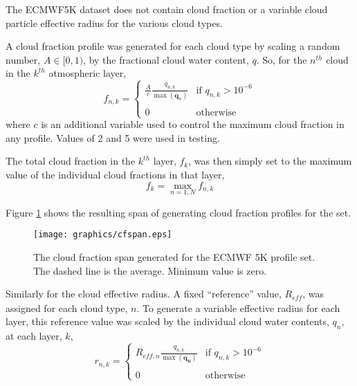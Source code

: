 The ECMWF5K dataset does not contain cloud fraction or a variable cloud particle effective radius for the various cloud types.

A cloud fraction profile was generated for each cloud type by scaling a random number, $A \in [0,1)$, by the fractional cloud water content, $q$. So, for the $n^{th}$ cloud in the $k^{th}$ atmospheric layer,
\begin{equation}
  f_{n,k} = \left\{
  \begin{array}{cl}
    \frac{\displaystyle{A}}{\displaystyle{c}}\frac{\displaystyle{q_{n,k}}}{\displaystyle{\max(\mathbf{q}_n)}} & \text{if } q_{n,k} > 10^{-6}\\\\
    0 & \text{otherwise}
  \end{array} \right.
  \label{eqn:f_individual}
\end{equation}
where $c$ is an additional variable used to control the maximum cloud fraction in any profile. Values of 2 and 5 were used in testing.

The total cloud fraction in the $k^{th}$ layer, $f_k$, was then simply set to the maximum value of the individual cloud fractions in that layer,
\begin{equation}
  f_k = \max_{n=1,N}f_{n,k}
  \label{eqn:f_total}
\end{equation}

Figure \ref{fig:ECMWF5K.cfspan} shows the resulting span of generating cloud fraction profiles for the set.

\begin{figure}[htp]
  \caption{The cloud fraction span generated for the ECMWF 5K profile set. The dashed line is the average. Minimum value is zero.}
  \label{fig:ECMWF5K.cfspan}
  \centering
  \texttt{[image: graphics/cfspan.eps]}
\end{figure}

Similarly for the cloud effective radius. A fixed ``reference'' value, $R_{\mathit{eff}}$, was assigned for each cloud type, $n$. To generate a variable effective radius for each layer, this reference value was scaled by the individual cloud water contents, $q_n$, at each layer, $k$,
\begin{equation}
  r_{n,k} = \left\{
  \begin{array}{cl}
    R_{\mathit{eff},n} \frac{\displaystyle{q_{n,k}}}{\displaystyle{\max(\mathbf{q_n})}} & \text{if } q_{n,k} > 10^{-6}\\\\
    0 & \text{otherwise}
  \end{array} \right.
  \label{eqn:r_individual}
\end{equation}

